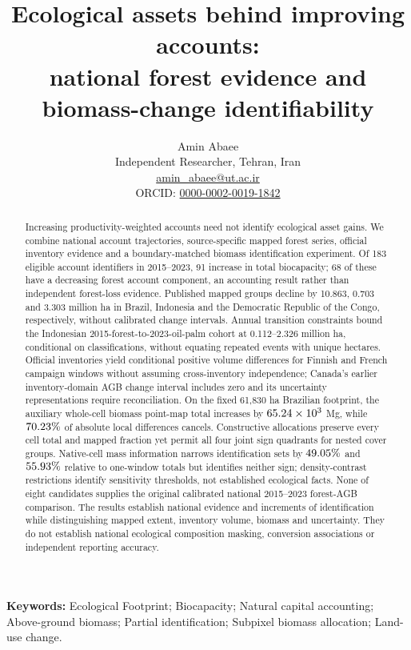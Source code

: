 \documentclass[11pt,a4paper]{article}
\title{Ecological assets behind improving accounts:\\national forest evidence and biomass-change identifiability}
\author{Amin Abaee\\\small Independent Researcher, Tehran, Iran\\\small\href{mailto:amin_abaee@ut.ac.ir}{amin\_abaee@ut.ac.ir}\\\small ORCID: \href{https://orcid.org/0000-0002-0019-1842}{0000-0002-0019-1842}}
\date{}
\begin{document}
\maketitle
\begin{abstract}
Increasing productivity-weighted accounts need not identify ecological asset gains. We combine national account trajectories, source-specific mapped forest series, official inventory evidence and a boundary-matched biomass identification experiment. Of 183 eligible account identifiers in 2015--2023, 91 increase in total biocapacity; 68 of these have a decreasing forest account component, an accounting result rather than independent forest-loss evidence. Published mapped groups decline by 10.863, 0.703 and 3.303 million ha in Brazil, Indonesia and the Democratic Republic of the Congo, respectively, without calibrated change intervals. Annual transition constraints bound the Indonesian 2015-forest-to-2023-oil-palm cohort at 0.112--2.326 million ha, conditional on classifications, without equating repeated events with unique hectares. Official inventories yield conditional positive volume differences for Finnish and French campaign windows without assuming cross-inventory independence; Canada's earlier inventory-domain AGB change interval includes zero and its uncertainty representations require reconciliation. On the fixed 61,830 ha Brazilian footprint, the auxiliary whole-cell biomass point-map total increases by $65.24\times10^3$ Mg, while $70.23\%$ of absolute local differences cancels. Constructive allocations preserve every cell total and mapped fraction yet permit all four joint sign quadrants for nested cover groups. Native-cell mass information narrows identification sets by $49.05\%$ and $55.93\%$ relative to one-window totals but identifies neither sign; density-contrast restrictions identify sensitivity thresholds, not established ecological facts. None of eight candidates supplies the original calibrated national 2015--2023 forest-AGB comparison. The results establish national evidence and increments of identification while distinguishing mapped extent, inventory volume, biomass and uncertainty. They do not establish national ecological composition masking, conversion associations or independent reporting accuracy.
\end{abstract}

\noindent\textbf{Keywords:} Ecological Footprint; Biocapacity; Natural capital accounting; Above-ground biomass; Partial identification; Subpixel biomass allocation; Land-use change.
\end{document}
